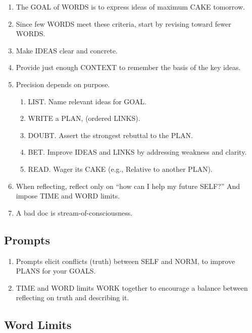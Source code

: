 \documentclass[
]{book}
\providecommand{\tightlist}{%
  \setlength{\itemsep}{0pt}\setlength{\parskip}{0pt}}
\begin{document}
\begin{enumerate}
\def\labelenumi{\arabic{enumi}.}
\tightlist
\item
  The GOAL of WORDS is to express ideas of maximum CAKE tomorrow.
\item
  Since few WORDS meet these criteria, start by revising toward fewer WORDS.
\item
  Make IDEAS clear and concrete.
\item
  Provide just enough CONTEXT to remember the basis of the key ideas.
\item
  Precision depends on purpose.

  \begin{enumerate}
  \def\labelenumii{\arabic{enumii}.}
  \tightlist
  \item
    LIST. Name relevant ideas for GOAL.
  \item
    WRITE a PLAN, (ordered LINKS).
  \item
    DOUBT. Assert the strongest rebuttal to the PLAN.
  \item
    BET. Improve IDEAS and LINKS by addressing weakness and clarity.
  \item
    READ. Wager its CAKE (e.g., Relative to another PLAN).
  \end{enumerate}
\item
  When reflecting, reflect only on ``how can I help my future SELF?'' And
  impose TIME and WORD limits.
\item
  A bad doc is stream-of-consciousness.
\end{enumerate}

\hypertarget{prompts}{%
\subsection{Prompts}\label{prompts}}

\begin{enumerate}
\def\labelenumi{\arabic{enumi}.}
\setcounter{enumi}{7}
\tightlist
\item
  Prompts elicit conflicts (truth) between SELF and NORM, to improve
  PLANS for your GOALS.
\item
  TIME and WORD limits WORK together to encourage a balance
  between reflecting on truth and describing it.
\end{enumerate}

\hypertarget{word-limits}{%
\subsection{Word Limits}\label{word-limits}}
\end{document}

